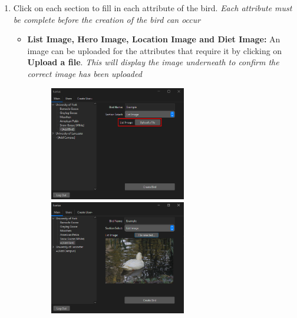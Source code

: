 \begin{enumerate}
    \item Click on each section to fill in each attribute of the bird. \textit{Each attribute must be complete before the creation of the bird can occur}
    \begin{itemize}
        \item \textbf{List Image, Hero Image, Location Image and Diet Image:}
        An image can be uploaded for the attributes that require it by clicking on \textbf{Upload a file}. \textit{This will display the image underneath to confirm the correct image has been uploaded}
        \begin{figure}[H]
            \centering
            \includegraphics[width=0.6\textwidth]{MainTab/AddBird/addBirdImage.PNG}
            \includegraphics[width=0.6\textwidth]{MainTab/AddBird/addBirdImageSelected.PNG}
        \end{figure}
        

\end{itemize}
\end{enumerate}
